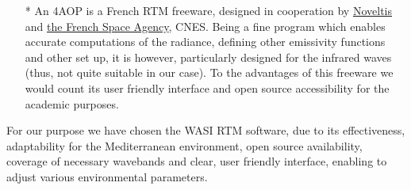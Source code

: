 \documentclass[11pt]{article}
\begin{document}
\begin{itemize}
		\item [*] An \ac{4AOP} is a French RTM freeware, designed in cooperation by \href{http://www.noveltis.fr/fr/index.php}{Noveltis} and \href{http://www.cnes.fr/}{the French Space Agency}, \ac{CNES}. Being a fine program which enables accurate computations of the radiance, defining other emissivity functions and other set up, it is however, particularly designed for the infrared waves (thus, not quite suitable in our case). To the advantages of this freeware we would count its user friendly interface and open source accessibility for the academic purposes. 
	\end{itemize}
For our purpose we have chosen the \ac{WASI} \ac{RTM} software, due to its effectiveness, adaptability for the Mediterranean environment, open source availability, coverage of necessary wavebands and clear, user friendly interface, enabling to adjust various environmental parameters.
\end{document}
